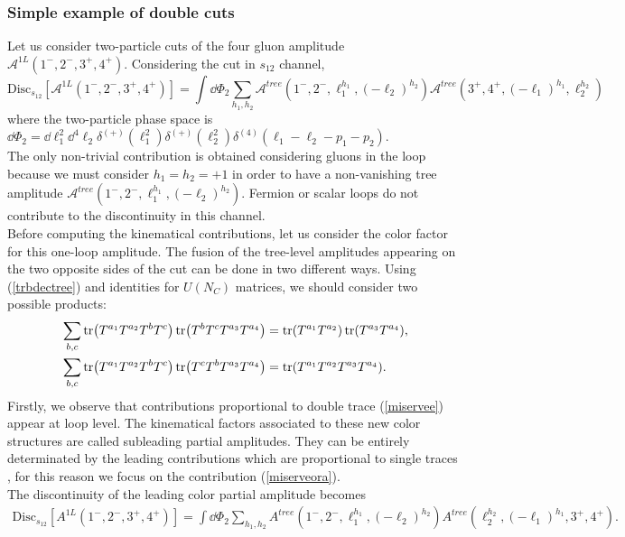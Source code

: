 \subsubsection{Simple example of double cuts}
Let us consider two-particle cuts of the four gluon amplitude $\mathcal{A}^{1L}(1^-,2^-,3^+,4^+)$.
Considering the cut in $s_{12}$ channel, 
$$
	\text{Disc}_{s_{12}}\left[\mathcal{A}^{1L}(1^-,2^-,3^+,4^+)\right]=\int \dd \Phi_2 \sum_{h_1,h_2} \mathcal{A}^{tree}(1^-,2^-,\ell_1^{h_1},(-\ell_2)^{h_2}) \mathcal{A}^{tree}(3^+,4^+,(-\ell_1)^{h_1},\ell_2^{h_2})
$$
where the two-particle phase space is $\dd\Phi_2=\dd \ell_1^2 \dd^4 \ell_2 \delta^{(+)}(\ell_1^2)\delta^{(+)}(\ell_2^2) \delta^{(4)}(\ell_1-\ell_2-p_1-p_2)$.\\
The only non-trivial contribution is obtained considering gluons in the loop because we must consider $h_1=h_2=+1$ in order to have a non-vanishing tree amplitude $\mathcal{A}^{tree}(1^-,2^-,\ell_1^{h_1},(-\ell_2)^{h_2})$. Fermion or scalar loops do not contribute to the discontinuity in this channel.\\
Before computing the kinematical contributions, let us consider the color factor for this one-loop amplitude. The fusion of the tree-level amplitudes appearing on the two opposite sides of the cut can be done in two different ways. Using (\ref{trbdectree}) and identities for $U(N_C)$ matrices, we should consider two possible products:
\begin{align}
	&\sum_{b,c} \tr(T^{a_1}T^{a_2}T^b T^c) \tr(T^b T^c T^{a_3} T^{a_4})=\tr (T^{a_1}T^{a_2}) \tr(T^{a_3}T^{a_4}),	\label{miservee}\\
	&\sum_{b,c} \tr(T^{a_1}T^{a_2}T^b T^c) \tr(T^c T^b T^{a_3} T^{a_4})=\tr(T^{a_1}T^{a_2}T^{a_3}T^{a_4}).	\label{miserveora}
\end{align}
Firstly, we observe that contributions proportional to double trace (\ref{miservee}) appear at loop level. The kinematical factors associated to these new color structures are called subleading partial amplitudes. They can be entirely determinated by the leading contributions which are proportional to single traces \cite{Bern:1990ux}, for this reason we focus on the contribution (\ref{miserveora}).\\
The discontinuity of the leading color partial amplitude becomes 
\begin{align*}
	\text{Disc}_{s_{12}}\left[A^{1L}(1^-,2^-,3^+,4^+)\right]=\int \dd \Phi_2 \sum_{h_1,h_2} A^{tree}(1^-,2^-,\ell_1^{h_1},(-\ell_2)^{h_2}) A^{tree}(\ell_2^{h_2},(-\ell_1)^{h_1},3^+,4^+).
\end{align*}
